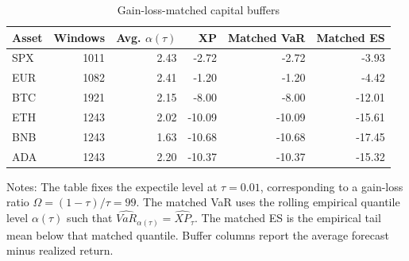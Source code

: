 \begin{table}[t]
\centering
\caption{Gain-loss-matched capital buffers}
\label{tab:app_matched_buffers}
\begin{tabular}{lrrrrr}
\toprule
Asset & Windows & Avg. \(\alpha(\tau)\) & XP & Matched VaR & Matched ES \\
\midrule
SPX & 1011 & 2.43 & -2.72 & -2.72 & -3.93 \\
EUR & 1082 & 2.41 & -1.20 & -1.20 & -4.42 \\
BTC & 1921 & 2.15 & -8.00 & -8.00 & -12.01 \\
ETH & 1243 & 2.02 & -10.09 & -10.09 & -15.61 \\
BNB & 1243 & 1.63 & -10.68 & -10.68 & -17.45 \\
ADA & 1243 & 2.20 & -10.37 & -10.37 & -15.32 \\
\bottomrule
\end{tabular}
\begin{flushleft}
\footnotesize
Notes: The table fixes the expectile level at \(\tau=0.01\), corresponding to
a gain-loss ratio \(\Omega=(1-\tau)/\tau=99\). The matched VaR uses
the rolling empirical quantile level \(\alpha(\tau)\) such that
\(\widehat{VaR}_{\alpha(\tau)}=\widehat{XP}_{\tau}\). The matched ES
is the empirical tail mean below that matched quantile. Buffer columns report
the average forecast minus realized return.
\end{flushleft}
\end{table}
